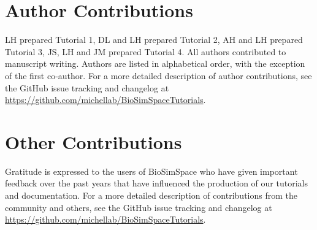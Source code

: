 \documentclass[9pt,tutorial]{livecoms}
\newcommand{\githubrepository}{\url{https://github.com/michellab/BioSimSpaceTutorials}}  %
\begin{document}
%








\section{Author Contributions}
%
LH prepared Tutorial 1, DL and LH prepared Tutorial 2, AH and LH prepared Tutorial 3, JS, LH and JM prepared Tutorial 4. 
All authors contributed to manuscript writing. Authors are listed in alphabetical order, with the exception of the first co-author.
For a more detailed description of author contributions,
see the GitHub issue tracking and changelog at \githubrepository.

\section{Other Contributions}
%
Gratitude is expressed to the users of BioSimSpace who have given important feedback over the past years that have influenced the production of our tutorials and documentation. 
For a more detailed description of contributions from the community and others, see the GitHub issue tracking and changelog at \githubrepository.
\end{document}
